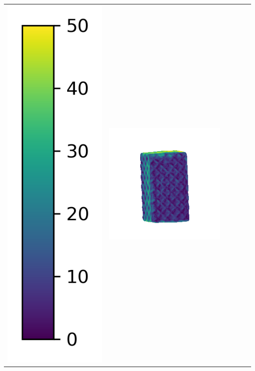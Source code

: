 \begin{tabularx}{\linewidth}{@{}Y@{}Y@{}Y@{}Y@{}Y@{}Y@{}}
\includegraphics[width=0.2\linewidth]{semisynthetic/colorbar_error_vertical.png} &
\includegraphics[width=\linewidth]{semisynthetic/20160617_18_ours_err.png} &

\end{tabularx}
